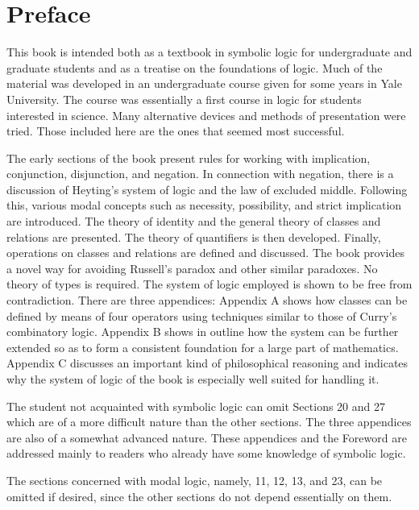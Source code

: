 \documentclass{book}
\begin{document}
\clearpage
{}
\chapter*{\vspace*{3ex}Preface}

This book is intended both as a textbook in symbolic logic for undergraduate and graduate students and as a treatise on the foundations of logic.  Much of the material was developed in an undergraduate course given for some years in Yale University.  The course was essentially a first course in logic for students interested in science.  Many alternative devices and methods of presentation were tried.  Those included here are the ones that seemed most successful.

The early sections of the book present rules for working with implication, conjunction, disjunction, and negation.  In connection with negation, there is a discussion of Heyting's system of logic and the law of excluded middle.  Following this, various modal concepts such as necessity, possibility, and strict implication are introduced.  The theory of identity and the general theory of classes and relations are presented.  The theory of quantifiers is then developed.  Finally, operations on classes and relations are defined and discussed.  The book provides a novel way for avoiding Russell's paradox and other similar paradoxes.  No theory of types is required.  The system of logic employed is shown to be free from contradiction.  There are three appendices: Appendix A shows how classes can be defined by means of four operators using techniques similar to those of Curry's combinatory logic.  Appendix B shows in outline how the system can be further extended so as to form a consistent foundation for a large part of mathematics.  Appendix C discusses an important kind of philosophical reasoning and indicates why the system of logic of the book is especially well suited for handling it.

The student not acquainted with symbolic logic can omit Sections 20 and 27 which are of a more difficult nature than the other sections.  The three appendices are also of a somewhat advanced nature.  These appendices and the Foreword are addressed mainly to readers who already have some knowledge of symbolic logic.

The sections concerned with modal logic, namely, 11, 12, 13, and 23, can be omitted if desired, since the other sections do not depend essentially on them.
\end{document}
